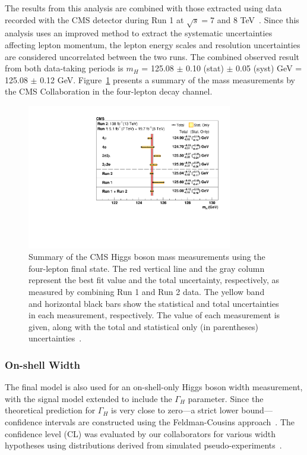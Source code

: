 The results from this analysis are combined with those extracted using data recorded with the  
CMS detector during Run 1 at $\sqrt{s}= 7$ and 8 TeV~\cite{Chatrchyan:2013mxa}. 
Since this analysis uses an improved method to extract the systematic uncertainties affecting lepton momentum, 
the lepton energy scales and resolution uncertainties are considered uncorrelated between the two runs. The combined observed result from both data-taking periods is $m_H$ = 125.08 $\pm$ 0.10 (stat) $\pm$ 0.05 (syst) GeV = 125.08 $\pm$ 0.12 GeV. Figure~\ref{Run1Run2_scan} presents a summary of the \Hboson mass measurements by the CMS Collaboration in the four-lepton decay channel.
\begin{figure}[!hbt]
  \centering
  \includegraphics[width=0.8\textwidth]{figures/Figure_009.pdf}
  \caption{Summary of the CMS Higgs boson mass measurements using the four-lepton final state. The red vertical line and the gray column represent the best fit value and the total uncertainty, respectively, as measured by combining Run 1 and Run 2 data. The yellow band and horizontal black bars show the statistical and total uncertainties in each measurement, respectively. The value of each measurement is given, along with the total and statistical only (in parentheses) uncertainties~\cite{PhysRevD.111.092014}.}
  \label{Run1Run2_scan}
\end{figure}

\subsubsection{On-shell Width}

The final \onshell model is also used for an on-shell-only Higgs boson width measurement, with the signal model extended to include the $\Gamma_H$ parameter. Since the theoretical prediction for $\Gamma_H$ is very close to zero---a strict lower bound---confidence intervals are constructed using the Feldman-Cousins approach~\cite{FC}. The confidence level (CL) was evaluated by our collaborators for various width hypotheses using distributions derived from simulated pseudo-experiments~\cite{PhysRevD.111.092014}.

